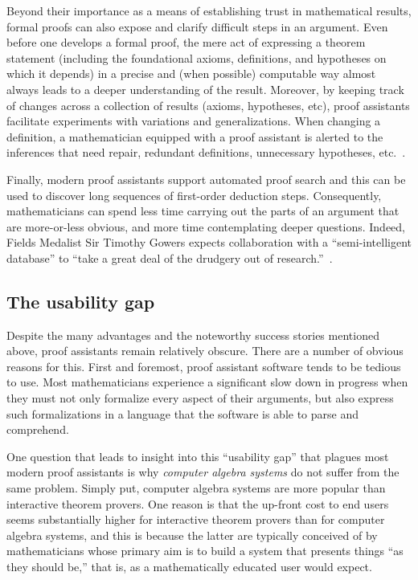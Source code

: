 \documentclass[11pt]{amsart}  %
\begin{document}
Beyond their importance as a means of establishing trust in mathematical results,
formal proofs can also expose and clarify difficult steps in an argument.
Even before one develops a formal proof, the mere act of expressing a theorem statement (including the foundational axioms, definitions, and hypotheses on which it depends) in a precise and (when possible) computable way almost always leads to a deeper understanding of the result. Moreover, by keeping track of changes across a collection of results (axioms, hypotheses, etc), proof assistants facilitate experiments with variations and generalizations. When changing a definition, a mathematician equipped with a proof assistant is alerted to the inferences that need repair, redundant definitions, unnecessary hypotheses, etc.~\cite{blanchette:2018}.

Finally, modern proof assistants support automated proof search and this can be
used to discover long sequences of first-order deduction steps.
Consequently, mathematicians can spend less time carrying out the parts of an 
argument that are more-or-less obvious, and more time 
contemplating deeper questions.
Indeed, Fields Medalist Sir Timothy Gowers expects collaboration with a ``semi-intelligent database'' to ``take a great deal of the drudgery out of research.''~\cite{gowers:2017}.



\subsection{The usability gap}
Despite the many advantages and the noteworthy success stories mentioned above, proof assistants remain relatively obscure. There are a number of obvious reasons for this.  First and foremost, proof assistant software tends to be tedious to use. Most mathematicians experience a significant slow down in progress when they must not only formalize every aspect of their arguments, but also express such formalizations in a language that the software is able to parse and comprehend.

One question that leads to insight into this ``usability gap'' that plagues most modern proof assistants is why \emph{computer algebra systems} do not suffer from the same problem. Simply put, computer algebra systems are more popular than interactive theorem provers. One reason is that the up-front cost to end users seems substantially higher for interactive theorem provers than for  computer algebra systems, and this is because the latter are typically conceived of by mathematicians whose primary aim is to build a system that presents things ``as they should be,'' that is, as a mathematically educated user would expect. 
\end{document}
